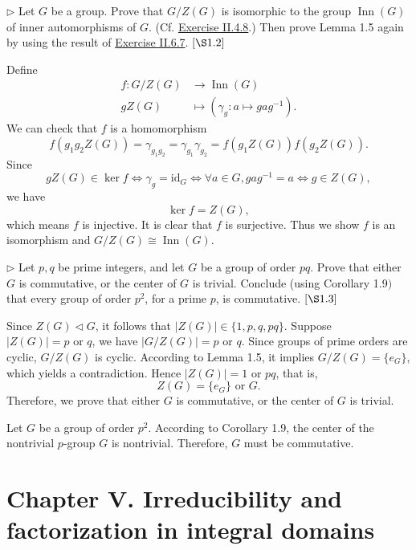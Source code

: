 \documentclass[12pt,letterpaper,boxed]{hmcpset}
\begin{document}
\begin{problem}[1.5]
$\triangleright$ Let $G$ be a group. Prove that $G / Z(G)$ is isomorphic to the group $\operatorname{Inn}(G)$ of inner automorphisms of $G .$ (Cf. \hyperlink{Exercise II.4.8}{Exercise II.4.8}.) Then prove Lemma 1.5 again by using the result of \hyperlink{Exercise II.6.7}{Exercise II.6.7}. $[\S 1.2]$
\end{problem}
\begin{solution}
Define
\begin{align*}
	f:G/Z(G)&\longrightarrow \operatorname{Inn}(G)\\
	gZ(G)&\longmapsto (\gamma_g:a\longmapsto gag^{-1}).
\end{align*}
We can check that $f$ is a homomorphism
\[
f(g_1g_2Z(G))=\gamma_{g_1g_2}=\gamma_{g_1}\gamma_{g_2}=f(g_1Z(G))f(g_2Z(G)).
\]
Since
\[
gZ(G)\in\ker f\iff \gamma_g=\mathrm{id}_G\iff\forall a\in G, gag^{-1}=a\iff g\in Z(G),
\]
we have
\[
\ker f=Z(G),
\]
which means $f$ is injective. It is clear that $f$ is surjective. Thus we show $f$ is an isomorphism and $G / Z(G)\cong\operatorname{Inn}(G)$.


\end{solution}

\begin{problem}[1.6]
$\triangleright$ Let $p, q$ be prime integers, and let $G$ be a group of order $p q .$ Prove that either $G$ is commutative, or the center of $G$ is trivial. Conclude (using Corollary 1.9$)$ that every group of order $p^{2}$, for a prime $p$, is commutative. $[\S 1.3]$
\end{problem}
\begin{solution}
Since $Z(G)\operatorname{\triangleleft} G$, it follows that  $|Z(G)|\in\{1,p,q,pq\}$. Suppose $|Z(G)|=p\text{  or  }q$, we have $|G/Z(G)|=p\text{  or  }q$. Since groups of prime orders are cyclic, $G/Z(G)$ is cyclic. According to Lemma 1.5, it implies $G / Z(G)=\{e_G\}$, which yields a contradiction. Hence $|Z(G)|=1\text{  or  }pq$, that is, 
\[
Z(G)=\{e_G\}\text{  or  }G.
\] 
Therefore, we prove that either $G$ is commutative, or the center of $G$ is trivial.

Let $G$ be a group of order $p^{2}$. According to Corollary 1.9, the center of the nontrivial $p$-group $G$ is nontrivial. Therefore, $G$ must be commutative.

\end{solution}




\newpage
\section{Chapter V.\hspace{0.2em} Irreducibility and	factorization in integral domains}
\end{document}

